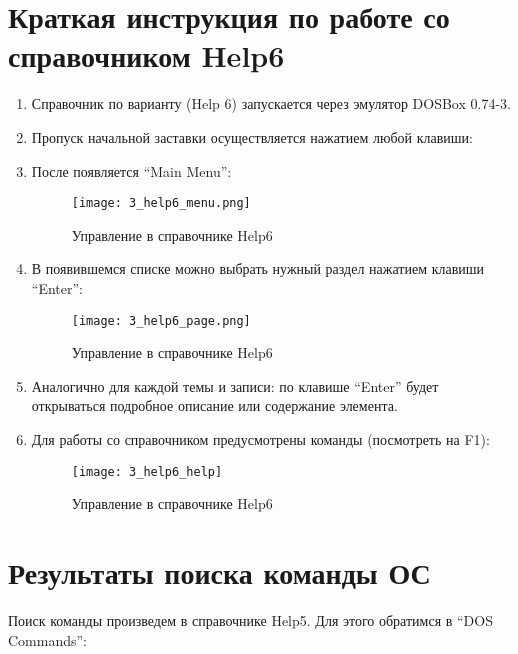 \section{Краткая инструкция по работе со справочником Help6}

\begin{enumerate}
  \item Справочник по варианту (Help 6) запускается через эмулятор DOSBox 0.74-3.
  \item Пропуск начальной заставки осуществляется нажатием любой клавиши:
  \item После появляется “Main Menu”:
        \begin{figure}[H]
          \begin{center}
            \texttt{[image: 3\_help6\_menu.png]}
            \caption{Управление в справочнике Help6}
            \label{pic:pic_name}
          \end{center}
        \end{figure}
  \item В появившемся списке можно выбрать нужный раздел нажатием клавиши “Enter”:
        \begin{figure}[H]
          \begin{center}
            \texttt{[image: 3\_help6\_page.png]}
            \caption{Управление в справочнике Help6}
            \label{pic:pic_name}
          \end{center}
        \end{figure}
  \item Аналогично для каждой темы и записи: по клавише “Enter” будет открываться подробное описание или содержание элемента.
  \item Для работы со справочником предусмотрены команды (посмотреть на F1):
        \begin{figure}[H]
          \begin{center}
            \texttt{[image: 3\_help6\_help]}
            \caption{Управление в справочнике Help6}
            \label{pic:pic_name}
          \end{center}
        \end{figure}
\end{enumerate}

\section{Результаты поиска команды ОС}

Поиск команды произведем в справочнике Help5. Для этого обратимся в “DOS Commands”:

